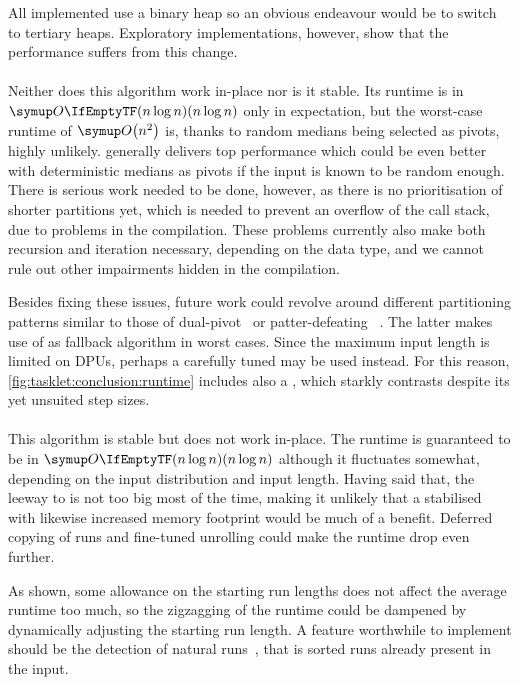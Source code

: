 All implemented \HS*{} use a binary heap so an obvious endeavour would be to switch to tertiary heaps.
Exploratory implementations, however, show that the performance suffers from this change.


\paragraph{\QS{}}
Neither does this algorithm work in-place nor is it stable.
Its runtime is in \(\bigoh{n \log n}\) only in expectation, but the worst-case runtime of \(\bigoh*{n^2}\) is, thanks to random medians being selected as pivots, highly unlikely.
\QS{} generally delivers top performance which could be even better with deterministic medians as pivots if the input is known to be random enough.
There is serious work needed to be done, however, as there is no prioritisation of shorter partitions yet, which is needed to prevent an overflow of the call stack, due to problems in the compilation.
These problems currently also make both recursion and iteration necessary, depending on the data type, and we cannot rule out other impairments hidden in the compilation.

Besides fixing these issues, future work could revolve around different partitioning patterns similar to those of dual-pivot~\cite{wild2012averagecase} or patter-defeating \QS{}~\cite{peters2021patterndefeatingquicksort}.
The latter makes use of \HS{} as fallback algorithm in worst cases.
Since the maximum input length is limited on DPUs, perhaps a carefully tuned \ShS{} may be used instead.
For this reason, \cref{fig:tasklet:conclusion:runtime} includes also a \ShS{}, which starkly contrasts \HS{} despite its yet unsuited step sizes.


\paragraph{\MS{}}
This algorithm is stable but does not work in-place.
The runtime is guaranteed to be in \(\bigoh{n \log n}\) although it fluctuates somewhat, depending on the input distribution and input length.
Having said that, the leeway to \QS{} is not too big most of the time, making it unlikely that a stabilised \QS{} with likewise increased memory footprint would be much of a benefit.
Deferred copying of runs and fine-tuned unrolling could make the runtime drop even further.

As shown, some allowance on the starting run lengths does not affect the average runtime too much, so the zigzagging of the runtime could be dampened by dynamically adjusting the starting run length.
A feature worthwhile to implement should be the detection of natural runs~\cites[Chapter~2.6]{lang2009algorithmen}[Chapter~2.3.2]{wirth1975algorithmen}, that is sorted runs already present in the input.

